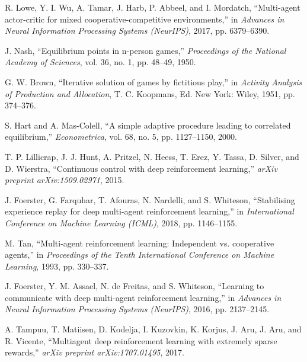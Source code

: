 \documentclass[conference]{IEEEtran}
\begin{document}
\begin{thebibliography}{9}

R. Lowe, Y. I. Wu, A. Tamar, J. Harb, P. Abbeel, and I. Mordatch, ``Multi-agent actor-critic for mixed cooperative-competitive environments,'' in \emph{Advances in Neural Information Processing Systems (NeurIPS)}, 2017, pp. 6379--6390.

J. Nash, ``Equilibrium points in n-person games,'' \emph{Proceedings of the National Academy of Sciences}, vol. 36, no. 1, pp. 48--49, 1950.

G. W. Brown, ``Iterative solution of games by fictitious play,'' in \emph{Activity Analysis of Production and Allocation}, T. C. Koopmans, Ed. New York: Wiley, 1951, pp. 374--376.

S. Hart and A. Mas-Colell, ``A simple adaptive procedure leading to correlated equilibrium,'' \emph{Econometrica}, vol. 68, no. 5, pp. 1127--1150, 2000.

T. P. Lillicrap, J. J. Hunt, A. Pritzel, N. Heess, T. Erez, Y. Tassa, D. Silver, and D. Wierstra, ``Continuous control with deep reinforcement learning,'' \emph{arXiv preprint arXiv:1509.02971}, 2015.

J. Foerster, G. Farquhar, T. Afouras, N. Nardelli, and S. Whiteson, ``Stabilising experience replay for deep multi-agent reinforcement learning,'' in \emph{International Conference on Machine Learning (ICML)}, 2018, pp. 1146--1155.

M. Tan, ``Multi-agent reinforcement learning: Independent vs. cooperative agents,'' in \emph{Proceedings of the Tenth International Conference on Machine Learning}, 1993, pp. 330--337.

J. Foerster, Y. M. Assael, N. de Freitas, and S. Whiteson, ``Learning to communicate with deep multi-agent reinforcement learning,'' in \emph{Advances in Neural Information Processing Systems (NeurIPS)}, 2016, pp. 2137--2145.

A. Tampuu, T. Matiisen, D. Kodelja, I. Kuzovkin, K. Korjus, J. Aru, J. Aru, and R. Vicente, ``Multiagent deep reinforcement learning with extremely sparse rewards,'' \emph{arXiv preprint arXiv:1707.01495}, 2017.

\end{thebibliography}

\end{document}
